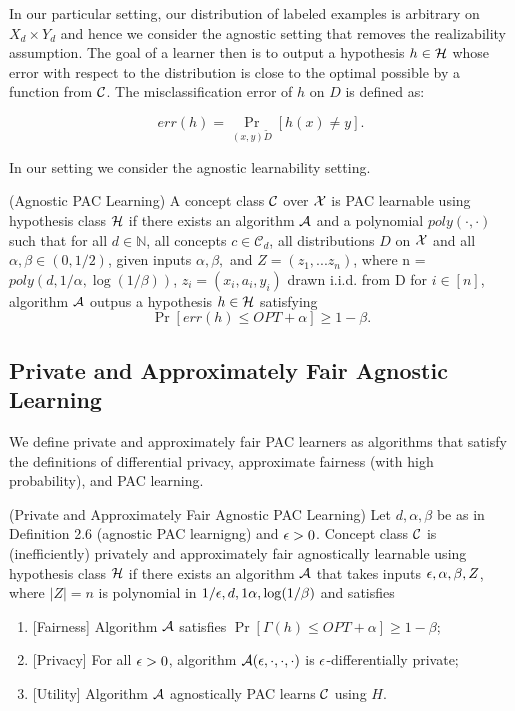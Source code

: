 In our particular setting, our distribution of labeled examples is
arbitrary on $X_d \times Y_d$ and hence we consider the agnostic
setting that removes the realizability assumption. The goal of a
learner then is to output a hypothesis $h \in \mathcal{H}$ whose error with
respect to the distribution is close to the optimal possible by a
function from $\mathcal{C}$. The misclassification error of $h$ on $D$ is
defined as:

$$err(h) = \Pr_{(x,y) \tilde D}[h(x) \neq y].$$

In our setting we consider the agnostic learnability setting.
\begin{defn}
	(Agnostic PAC Learning) A concept class $\mathcal{C}$ over $\mathcal{X}$ is PAC
  learnable using hypothesis class $\mathcal{H}$ if there exists an algorithm
  $\mathcal{A}$ and a polynomial $poly(\cdot,\cdot)$ such that for all $d \in
  \mathbb{N}$, all concepts $c \in \mathcal{C}_d$, all distributions
  $D$ on $\mathcal{X}$ and all $\alpha,\beta \in (0,1/2)$, given inputs
  $\alpha,\beta,$ and $Z = (z_1, ... z_n)$, where n = $poly(d,
  1/\alpha, \log(1/\beta))$, $z_i = (x_i, a_i, y_i)$ drawn i.i.d. from
  D for $i \in [n]$, algorithm $\mathcal{A}$ outpus a hypothesis $h \in \mathcal{H}$
  satisfying
	$$\Pr[err(h) \leq OPT + \alpha] \geq 1-\beta.$$

\end{defn}
\subsection{Private and Approximately Fair Agnostic Learning}
We define private and approximately fair PAC learners as algorithms that satisfy the definitions of differential privacy, approximate fairness (with high probability), and PAC learning.
\begin{defn}
	(Private and Approximately Fair Agnostic PAC Learning)
	Let $d, \alpha, \beta$ be as in Definition 2.6 (agnostic PAC
  learnigng) and $\epsilon > 0$. Concept class $\mathcal{C}$ is (inefficiently)
  privately and approximately fair agnostically learnable using
  hypothesis class $\mathcal{H}$ if there exists an algorithm $\mathcal{A}$ that takes
  inputs $\epsilon, \alpha, \beta, Z$, where $|Z|=n$ is polynomial in
  $1/\epsilon, d, 1\alpha, \log(1/\beta)$ and satisfies
	\begin{enumerate}
		\item {[}Fairness{]} Algorithm $\mathcal{A}$ satisfies $\Pr[\Gamma(h) \leq
    OPT + \alpha] \geq 1-\beta$;
		\item {[}Privacy{]} For all $\epsilon>0$, algorithm $\mathcal{A}(\epsilon, \cdot, \cdot, \cdot)$ is $\epsilon$-differentially private;
		\item {[}Utility{]} Algorithm $\mathcal{A}$ agnostically PAC learns $\mathcal{C}$ using $H$.
	\end{enumerate}
\end{defn}

